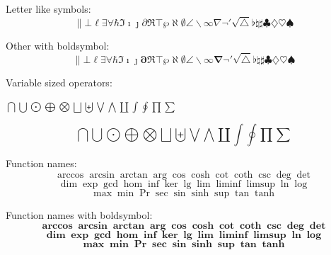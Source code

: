 \documentclass[12pt,a4paper]{article}
\theoremstyle{clearprint}
\begin{document}
\noindent 
Letter like symbols: %
\begin{equation}
\| \bot \ell \exists \forall \hbar \Im \imath \jmath \partial \Re \top \wp
\aleph \emptyset \angle \backslash \infty \nabla \neg \prime \surd \triangle
\flat \natural \sharp
\clubsuit \diamondsuit \heartsuit \spadesuit
\end{equation}

\noindent 
Other with boldsymbol:
\begin{equation}
\boldsymbol{\| \bot \ell \exists \forall \hbar \Im \imath \jmath \partial \Re \top \wp
\aleph \emptyset \angle \backslash \infty \nabla \neg \prime \surd \triangle
\flat \natural \sharp
\clubsuit \diamondsuit \heartsuit \spadesuit
}
\end{equation}

\noindent 
Variable sized operators: %
\begin{center}
$\bigcap \bigcup \bigodot \bigoplus \bigotimes \bigsqcup \biguplus \bigvee \bigwedge \coprod \int \oint \prod \sum$ 
\end{center}

\begin{equation}
\bigcap \bigcup \bigodot \bigoplus \bigotimes \bigsqcup \biguplus \bigvee \bigwedge \coprod \int \oint \prod \sum
\end{equation}

\noindent 
Function names: %
\begin{equation}
\arccos \arcsin \arctan \arg \cos \cosh \cot \coth \csc \deg \det 
\end{equation}
\begin{equation}
\dim \exp \gcd \hom \inf \ker \lg \lim \liminf \limsup \ln \log 
\end{equation}
\begin{equation}
\max \min \Pr \sec \sin \sinh \sup \tan \tanh
\end{equation}

\noindent 
Function names with boldsymbol:
\begin{equation}
\boldsymbol{\arccos \arcsin \arctan \arg \cos \cosh \cot \coth \csc \deg \det} 
\end{equation}
\begin{equation}
\boldsymbol{\dim \exp \gcd \hom \inf \ker \lg \lim \liminf \limsup \ln \log} 
\end{equation}
\begin{equation}
\boldsymbol{\max \min \Pr \sec \sin \sinh \sup \tan \tanh}
\end{equation}
\end{document}
